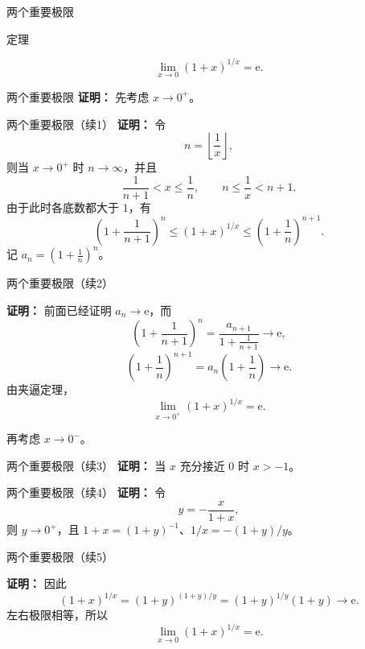 \documentclass[aspectratio=169,10pt,fontset=fandol]{ctexbeamer}
\newcommand{\ee}{\mathrm{e}}
\begin{document}
\begin{frame}[t,fragile]{两个重要极限}
\footnotesize
\begin{block}{定理}
{\footnotesize

\[
\lim_{x\to0}(1+x)^{1/x}=\ee.
\]

}
\end{block}
\end{frame}
\begin{frame}[t,fragile]{两个重要极限}
\footnotesize
{\footnotesize
\textbf{证明：}
先考虑 \(x\to0^+\)。
}
\end{frame}
\begin{frame}[t,fragile]{两个重要极限（续1）}
\footnotesize
{\footnotesize
\textbf{证明：}
令
\[
n=\left\lfloor\frac1x\right\rfloor,
\]
则当 \(x\to0^+\) 时 \(n\to\infty\)，并且
\[
\frac1{n+1}<x\leq\frac1n,\qquad n\leq\frac1x<n+1.
\]
由于此时各底数都大于 \(1\)，有
\[
\left(1+\frac1{n+1}\right)^n
\leq(1+x)^{1/x}
\leq\left(1+\frac1n\right)^{n+1}.
\]
记 \(a_n=(1+\frac1n)^n\)。
}
\end{frame}
\begin{frame}[t,fragile]{两个重要极限（续2）}
\footnotesize
{\footnotesize
\textbf{证明：}
前面已经证明 \(a_n\to\ee\)，而
\[
\left(1+\frac1{n+1}\right)^n
=\frac{a_{n+1}}{1+\frac1{n+1}}\to\ee,
\]
\[
\left(1+\frac1n\right)^{n+1}
=a_n\left(1+\frac1n\right)\to\ee.
\]
由夹逼定理，
\[
\lim_{x\to0^+}(1+x)^{1/x}=\ee.
\]

再考虑 \(x\to0^-\)。
}
\end{frame}
\begin{frame}[t,fragile]{两个重要极限（续3）}
\footnotesize
{\footnotesize
\textbf{证明：}
当 \(x\) 充分接近 \(0\) 时 \(x>-1\)。
}
\end{frame}
\begin{frame}[t,fragile]{两个重要极限（续4）}
\footnotesize
{\footnotesize
\textbf{证明：}
令
\[
y=-\frac{x}{1+x},
\]
则 \(y\to0^+\)，且 \(1+x=(1+y)^{-1}\)、\(1/x=-(1+y)/y\)。
}
\end{frame}
\begin{frame}[t,fragile]{两个重要极限（续5）}
\footnotesize
{\footnotesize
\textbf{证明：}
因此
\[
(1+x)^{1/x}
=(1+y)^{(1+y)/y}
=(1+y)^{1/y}(1+y)\to\ee.
\]
左右极限相等，所以
\[
\lim_{x\to0}(1+x)^{1/x}=\ee.
\]

}
\end{frame}
\end{document}

